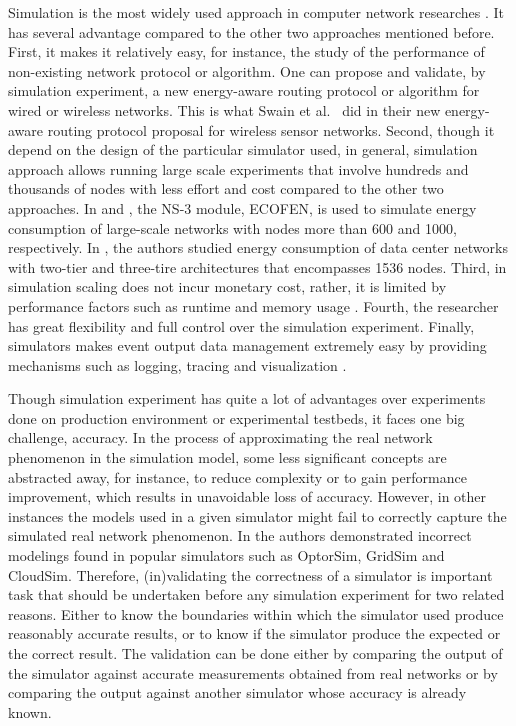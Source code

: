 Simulation is the most widely used approach in computer network researches \cite{DBLP:conf/icc/WeingartnerLW09}. It has several advantage compared to the other two approaches mentioned before. First, it makes it relatively easy, for instance, the study of the performance of non-existing network protocol or algorithm. One can propose and validate, by simulation experiment, a new energy-aware routing protocol or algorithm for wired or wireless networks. This is what Swain et al.{\ }\cite{DBLP:conf/aina/SwainHC10} did in their new energy-aware routing protocol proposal for wireless sensor networks. Second, though it depend on the design of the particular simulator used, in general, simulation approach allows running large scale experiments that involve hundreds and thousands of nodes with less effort and cost compared to the other two approaches. In \cite{DBLP:conf/wowmom/OrgerieLLL11} and \cite{DBLP:conf/cloudnet/CorneaOL14}, the NS-3 module, ECOFEN, is used to simulate energy consumption of large-scale networks with nodes more than 600 and 1000, respectively. In \cite{DBLP:journals/tjs/KliazovichBK12}, the authors studied energy consumption of data center networks with two-tier and three-tire architectures that encompasses 1536 nodes. Third, in simulation scaling does not incur monetary cost, rather, it is limited by performance factors such as runtime and memory usage \cite{DBLP:conf/icc/WeingartnerLW09}. Fourth, the researcher has great flexibility and full control over the simulation experiment. Finally, simulators makes event output data management extremely easy by providing mechanisms such as logging, tracing and visualization \cite{ns3,DBLP:journals/jpdc/CasanovaGLQS14}.  

Though simulation experiment has quite a lot of advantages over experiments done on production environment or experimental testbeds, it faces one big challenge, accuracy. In the process of approximating the real network phenomenon in the simulation model, some less significant concepts are abstracted away, for instance, to reduce complexity or to gain performance improvement, which results in unavoidable loss of accuracy. However, in other instances the models used in a given simulator might fail to correctly capture the simulated real network phenomenon. In \cite{DBLP:journals/tomacs/VelhoSCL13} the authors demonstrated incorrect modelings found in popular simulators such as OptorSim, GridSim and CloudSim. Therefore, (in)validating the correctness of a simulator is important task that should be undertaken before any simulation experiment for two related reasons. Either to know the boundaries within which the simulator used produce reasonably accurate results, or to know if the simulator produce the expected or the correct result. The validation can be done either by comparing the output of the simulator against accurate measurements obtained from real networks or by comparing the output against another simulator whose accuracy is already known\cite{DBLP:books/daglib/0076234}.
